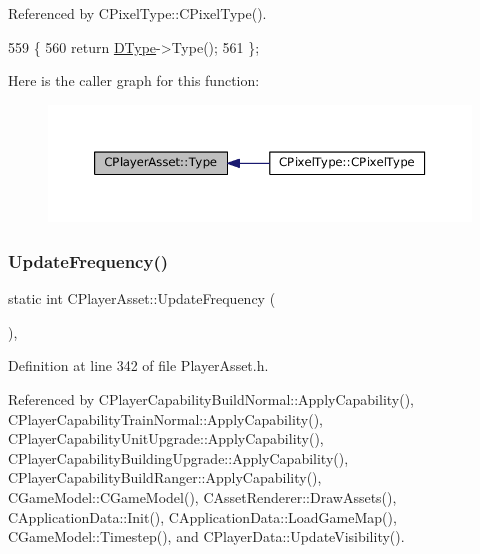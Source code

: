 Referenced by C\+Pixel\+Type\+::\+C\+Pixel\+Type().


\begin{DoxyCode}
559                                \{
560             \textcolor{keywordflow}{return} \hyperlink{classCPlayerAsset_a5d61f73471e1e6f0a6ab15f2ffa7b359}{DType}->Type();  
561         \};
\end{DoxyCode}
Here is the caller graph for this function\+:\nopagebreak
\begin{figure}[H]
\begin{center}
\leavevmode
\includegraphics[width=350pt]{classCPlayerAsset_a6d6aeea4e8b02e0f239bac95db6d9e0a_icgraph}
\end{center}
\end{figure}
\hypertarget{classCPlayerAsset_a0aff85b9552967a42f4f3f42cb59c19f}{}\label{classCPlayerAsset_a0aff85b9552967a42f4f3f42cb59c19f} 
\subsubsection{\texorpdfstring{Update\+Frequency()}{UpdateFrequency()}\hspace{0.1cm}{\footnotesize\ttfamily [1/2]}}
{\footnotesize\ttfamily static int C\+Player\+Asset\+::\+Update\+Frequency (\begin{DoxyParamCaption}{ }\end{DoxyParamCaption})\hspace{0.3cm}{\ttfamily [inline]}, {\ttfamily [static]}}



Definition at line 342 of file Player\+Asset.\+h.



Referenced by C\+Player\+Capability\+Build\+Normal\+::\+Apply\+Capability(), C\+Player\+Capability\+Train\+Normal\+::\+Apply\+Capability(), C\+Player\+Capability\+Unit\+Upgrade\+::\+Apply\+Capability(), C\+Player\+Capability\+Building\+Upgrade\+::\+Apply\+Capability(), C\+Player\+Capability\+Build\+Ranger\+::\+Apply\+Capability(), C\+Game\+Model\+::\+C\+Game\+Model(), C\+Asset\+Renderer\+::\+Draw\+Assets(), C\+Application\+Data\+::\+Init(), C\+Application\+Data\+::\+Load\+Game\+Map(), C\+Game\+Model\+::\+Timestep(), and C\+Player\+Data\+::\+Update\+Visibility().


